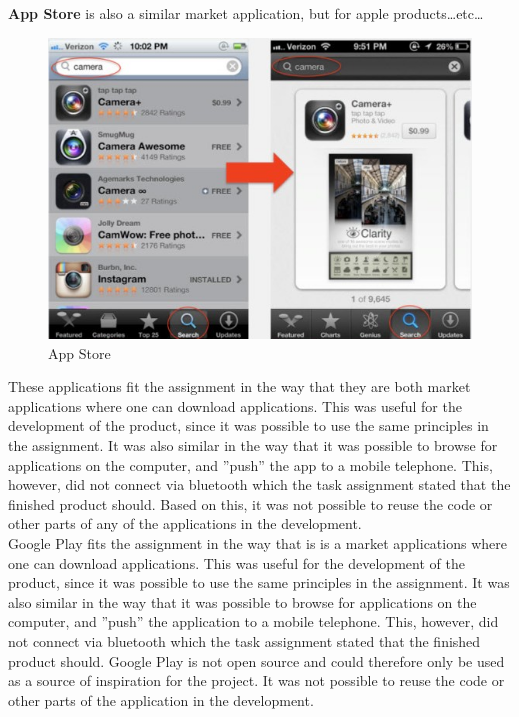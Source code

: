 \textbf{App Store} is also a similar market application, but for apple products\ldots etc\ldots\\
\begin{figure}[H]
\includegraphics[scale=0.7]{images/png;base642dee0c596030bc1e.png}
\caption{App Store}
\end{figure}
These applications fit the assignment in the way that they are both market applications where one can download applications. This was useful for the development of the product, since it was possible to use the same principles in the assignment. It was also similar in the way that it was possible to browse for applications on the computer, and ''push'' the app to a mobile telephone. This, however, did not connect via bluetooth which the task assignment stated that the finished product should. Based on this, it was not possible to reuse the code or other parts of any of the applications in the development. 
\\

Google Play fits the assignment in the way that is is a market applications where one can download applications. This was useful for the development of the product, since it was possible to use the same principles in the assignment. It was also similar in the way that it was possible to browse for applications on the computer, and ''push'' the application to a mobile telephone. This, however, did not connect via bluetooth which the task assignment stated that the finished product should. Google Play is not open source and could therefore only be used as a source of inspiration for the project. It was not possible to reuse the code or other parts of the application in the development. 


